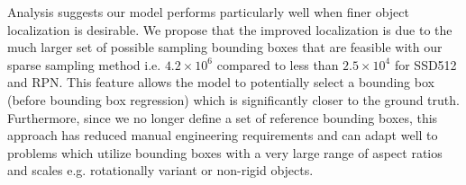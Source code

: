 \documentclass[10pt,twocolumn]{article}
\begin{document}
Analysis suggests our model performs particularly well when finer object localization is desirable. We propose that the improved localization is due to the much larger set of possible sampling bounding boxes that are feasible with our sparse sampling method i.e. $4.2\times 10^6$ compared to less than $2.5\times 10^4$ for SSD512 and RPN. This feature allows the model to potentially select a bounding box (before bounding box regression) which is significantly closer to the ground truth. Furthermore, since we no longer define a set of reference bounding boxes, this approach has reduced manual engineering requirements and can adapt well to problems which utilize bounding boxes with a very large range of aspect ratios and scales e.g. rotationally variant or non-rigid objects. 

\clearpage
\newpage

{\small


}
\end{document}

